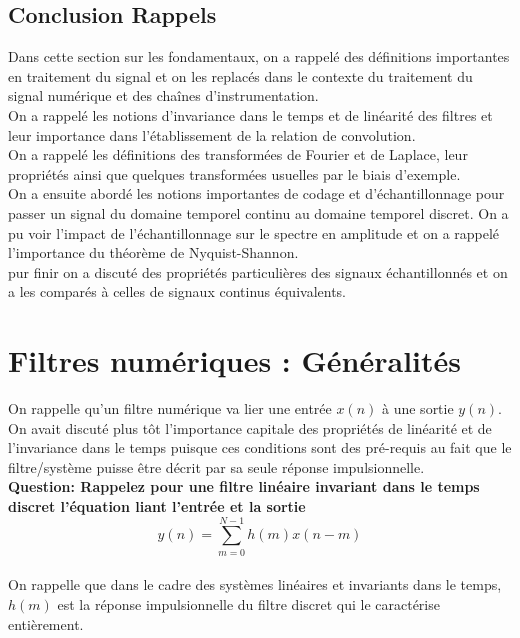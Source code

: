 \documentclass[11pt,a4paper]{article}
\begin{document}
\subsection{Conclusion Rappels}
Dans cette section sur les fondamentaux, on a rappelé des définitions importantes en traitement du signal et on les replacés dans le contexte du traitement du signal numérique et des chaînes d'instrumentation.\\

On a rappelé les notions d'invariance dans le temps et de linéarité des filtres et leur importance dans l'établissement de la relation de convolution.\\

On a rappelé les définitions des transformées de Fourier et de Laplace, leur propriétés ainsi que quelques transformées usuelles par le biais d'exemple.\\

On a ensuite abordé les notions importantes de codage et d'échantillonnage pour passer un signal du domaine temporel continu au domaine temporel discret. On a pu voir l'impact de l'échantillonnage sur le spectre en amplitude et on a rappelé l'importance du théorème de Nyquist-Shannon. \\
pur finir on a discuté des propriétés particulières des signaux échantillonnés et on a les comparés à celles de signaux continus équivalents.\\

\section{Filtres numériques : Généralités}
On rappelle qu'un filtre numérique va lier une entrée $x(n)$ à une sortie $y(n)$. On avait discuté plus tôt l'importance capitale des propriétés de linéarité et de l'invariance dans le temps puisque ces conditions sont des pré-requis au fait que le filtre/système puisse être décrit par sa seule réponse impulsionnelle.\\

\textbf{Question: Rappelez pour une filtre linéaire invariant dans le temps discret l'équation liant l'entrée et la sortie}\\

\[ y(n) = \sum_{m = 0}^{N-1} h(m) x(n-m) \]\\

On rappelle que dans le cadre des systèmes linéaires et invariants dans le temps, $h(m)$ est la réponse impulsionnelle du filtre discret qui le caractérise entièrement.
\end{document}
